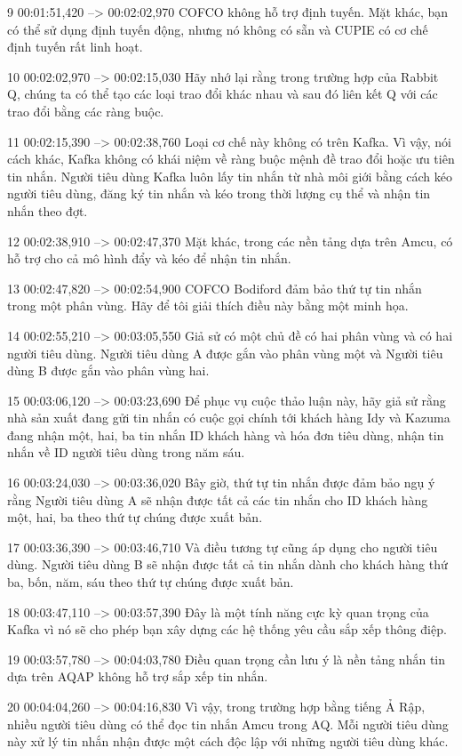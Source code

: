 9
00:01:51,420 --> 00:02:02,970
COFCO không hỗ trợ định tuyến.  Mặt khác, bạn có thể sử dụng định tuyến động, nhưng nó không có sẵn và CUPIE có cơ chế định tuyến rất linh hoạt.

10
00:02:02,970 --> 00:02:15,030
Hãy nhớ lại rằng trong trường hợp của Rabbit Q, chúng ta có thể tạo các loại trao đổi khác nhau và sau đó liên kết Q với các trao đổi bằng các ràng buộc.

11
00:02:15,390 --> 00:02:38,760
Loại cơ chế này không có trên Kafka.  Vì vậy, nói cách khác, Kafka không có khái niệm về ràng buộc mệnh đề trao đổi hoặc ưu tiên tin nhắn. Người tiêu dùng Kafka luôn lấy tin nhắn từ nhà môi giới bằng cách kéo người tiêu dùng, đăng ký tin nhắn và kéo trong thời lượng cụ thể và nhận tin nhắn theo đợt.

12
00:02:38,910 --> 00:02:47,370
Mặt khác, trong các nền tảng dựa trên Amcu, có hỗ trợ cho cả mô hình đẩy và kéo để nhận tin nhắn.

13
00:02:47,820 --> 00:02:54,900
COFCO Bodiford đảm bảo thứ tự tin nhắn trong một phân vùng.  Hãy để tôi giải thích điều này bằng một minh họa.

14
00:02:55,210 --> 00:03:05,550
Giả sử có một chủ đề có hai phân vùng và có hai người tiêu dùng.  Người tiêu dùng A được gắn vào phân vùng một và Người tiêu dùng B được gắn vào phân vùng hai.

15
00:03:06,120 --> 00:03:23,690
Để phục vụ cuộc thảo luận này, hãy giả sử rằng nhà sản xuất đang gửi tin nhắn có cuộc gọi chính tới khách hàng Idy và Kazuma đang nhận một, hai, ba tin nhắn ID khách hàng và hóa đơn tiêu dùng, nhận tin nhắn về ID người tiêu dùng trong năm sáu.

16
00:03:24,030 --> 00:03:36,020
Bây giờ, thứ tự tin nhắn được đảm bảo ngụ ý rằng Người tiêu dùng A sẽ nhận được tất cả các tin nhắn cho ID khách hàng một, hai, ba theo thứ tự chúng được xuất bản.

17
00:03:36,390 --> 00:03:46,710
Và điều tương tự cũng áp dụng cho người tiêu dùng.  Người tiêu dùng B sẽ nhận được tất cả tin nhắn dành cho khách hàng thứ ba, bốn, năm, sáu theo thứ tự chúng được xuất bản.

18
00:03:47,110 --> 00:03:57,390
Đây là một tính năng cực kỳ quan trọng của Kafka vì nó sẽ cho phép bạn xây dựng các hệ thống yêu cầu sắp xếp thông điệp.

19
00:03:57,780 --> 00:04:03,780
Điều quan trọng cần lưu ý là nền tảng nhắn tin dựa trên AQAP không hỗ trợ sắp xếp tin nhắn.

20
00:04:04,260 --> 00:04:16,830
Vì vậy, trong trường hợp bằng tiếng Ả Rập, nhiều người tiêu dùng có thể đọc tin nhắn Amcu trong AQ.  Mỗi người tiêu dùng này xử lý tin nhắn nhận được một cách độc lập với những người tiêu dùng khác.

